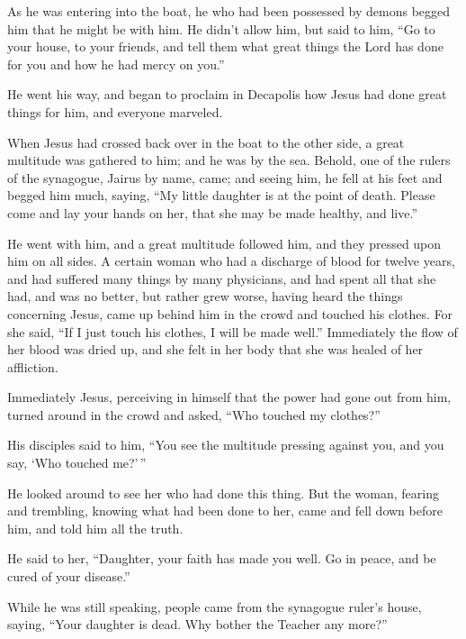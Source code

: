  As he was entering into the boat, he who had been
possessed by demons begged him that he might be with him.
 He didn't allow him, but said to him, ``Go to your
house, to your friends, and tell them what great things the Lord has
done for you and how he had mercy on you.''

 He went his way, and began to proclaim in Decapolis how
Jesus had done great things for him, and everyone marveled.

 When Jesus had crossed back over in the boat to the
other side, a great multitude was gathered to him; and he was by the
sea.  Behold, one of the rulers of the synagogue, Jairus
by name, came; and seeing him, he fell at his feet  and
begged him much, saying, ``My little daughter is at the point of death.
Please come and lay your hands on her, that she may be made healthy, and
live.''

 He went with him, and a great multitude followed him,
and they pressed upon him on all sides.  A certain woman
who had a discharge of blood for twelve years,  and had
suffered many things by many physicians, and had spent all that she had,
and was no better, but rather grew worse,  having heard
the things concerning Jesus, came up behind him in the crowd and touched
his clothes.  For she said, ``If I just touch his
clothes, I will be made well.''  Immediately the flow of
her blood was dried up, and she felt in her body that she was healed of
her affliction.

 Immediately Jesus, perceiving in himself that the power
had gone out from him, turned around in the crowd and asked, ``Who
touched my clothes?''

 His disciples said to him, ``You see the multitude
pressing against you, and you say, `Who touched me?'\,''

 He looked around to see her who had done this thing.
 But the woman, fearing and trembling, knowing what had
been done to her, came and fell down before him, and told him all the
truth.

 He said to her, ``Daughter, your faith has made you
well. Go in peace, and be cured of your disease.''

 While he was still speaking, people came from the
synagogue ruler's house, saying, ``Your daughter is dead. Why bother the
Teacher any more?''

